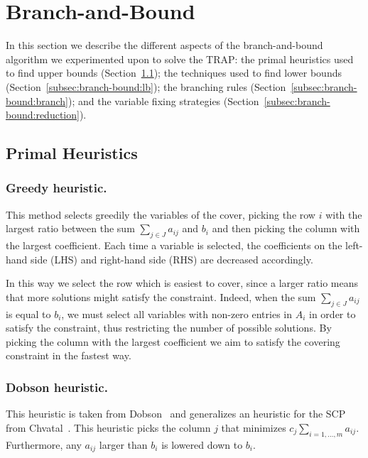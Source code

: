 \documentclass[runningheads]{llncs}
\begin{document}
\section{Branch-and-Bound}
\label{sec:branch-bound}

In this section we describe the different aspects of the branch-and-bound algorithm we experimented upon to solve the TRAP: the primal heuristics used to find upper bounds (Section~\ref{subsec:branch-bound:primal}); the techniques used to find lower bounds (Section~\ref{subsec:branch-bound:lb}); the branching rules (Section~\ref{subsec:branch-bound:branch}); and the variable fixing strategies (Section~\ref{subsec:branch-bound:reduction}). 

\subsection{Primal Heuristics}
\label{subsec:branch-bound:primal}

\subsubsection{Greedy heuristic.} This method selects greedily the variables of the cover, picking the row $i$ with the largest ratio between the sum $\sum_{j \in J} a_{ij}$ and $b_i$ and then picking the column with the largest coefficient. Each time a variable is selected, the coefficients on the left-hand side (LHS) and right-hand side (RHS) are decreased accordingly.

In this way we select the row which is easiest to cover, since a larger ratio means that more solutions might satisfy the constraint. Indeed, when the sum $\sum_{j \in J} a_{ij}$ is equal to $b_i$, we must select all variables with non-zero entries in $A_i$ in order to satisfy the constraint, thus restricting the number of possible solutions. By picking the column with the largest coefficient we aim to satisfy the covering constraint in the fastest way.

\subsubsection{Dobson heuristic.} This heuristic is taken from Dobson~\cite{dobson-1982-worst-case} and generalizes an heuristic for the SCP from Chvatal~\cite{chvatal-1979-greedy}. This heuristic picks the column $j$ that minimizes $c_j \sum_{i=1,\dots,m} a_{ij}$. Furthermore, any $a_{ij}$ larger than $b_i$ is lowered down to $b_i$.
\end{document}
